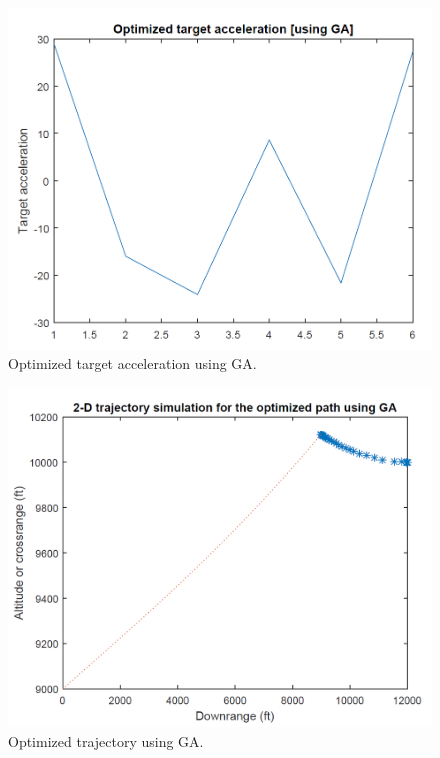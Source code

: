 \begin{figure}[H]
	\centering
	\includegraphics[scale = 0.4]{fig/GApolyXNT.PNG}
	\caption{Optimized target acceleration using GA.}
	\label{GA poly XNT}
\end{figure}


\begin{figure}[H]
	\centering
	\includegraphics[scale = 0.4]{fig/polyTrajectory.PNG}
	\caption{Optimized trajectory using GA.}
	\label{GA poly trajectory}
\end{figure}


